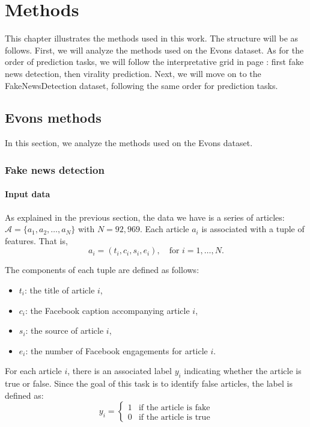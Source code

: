 \documentclass[a4paper,twoside,12pt]{book}
\begin{document}
\chapter{Methods} \label{Methods}
This chapter illustrates the methods used in this work. The structure will be as follows. First, we will analyze the methods used on the Evons dataset. As for the order of prediction tasks, we will follow the interpretative grid in page \pageref{tab:grid}: first fake news detection, then virality prediction.
Next, we will move on to the FakeNewsDetection dataset, following the same order for prediction tasks.

\section{Evons methods}
In this section, we analyze the methods used on the Evons dataset.

\subsection*{Fake news detection}

\subsubsection*{Input data}

As explained in the previous section, the data we have is a series of articles: $\mathcal{A} = \{ a_1, a_2, \dots, a_N \}$ with $N = 92{,}969$. Each article $a_i$ is associated with a tuple of features. That is,
\[
a_i = (t_i, c_i, s_i, e_i), \quad \text{for } i = 1, \dots, N.
\]

The components of each tuple are defined as follows:
\begin{itemize}
	\item $t_i$: the title of article $i$,
	\item $c_i$: the Facebook caption accompanying article $i$,
	\item $s_i$: the source of article $i$,
	\item $e_i$: the number of Facebook engagements for article $i$.
\end{itemize}


For each article $i$, there is an associated label $y_i$ indicating whether the article is true or false. 
Since the goal of this task is to identify false articles, the label is defined as:
$$
y_i =
\begin{cases}
	1 & \text{if the article is fake} \\
	0 & \text{if the article is true}
\end{cases}
$$
\end{document}
